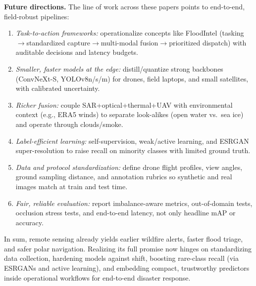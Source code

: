 \documentclass[conference,a4paper]{IEEEtran}
\begin{document}
\textbf{Future directions.} The line of work across these papers points to end-to-end, field-robust pipelines:
\begin{enumerate}
  \item \textit{Task-to-action frameworks:} operationalize concepts like FloodIntel (tasking$\rightarrow$standardized capture$\rightarrow$multi-modal fusion$\rightarrow$prioritized dispatch) with auditable decisions and latency budgets.
  \item \textit{Smaller, faster models at the edge:} distill/quantize strong backbones (ConvNeXt-S, YOLOv8n/s/m) for drones, field laptops, and small satellites, with calibrated uncertainty.
  \item \textit{Richer fusion:} couple SAR+optical+thermal+UAV with environmental context (e.g., ERA5 winds) to separate look-alikes (open water vs.\ sea ice) and operate through clouds/smoke.
  \item \textit{Label-efficient learning:} self-supervision, weak/active learning, and ESRGAN super-resolution to raise recall on minority classes with limited ground truth.
  \item \textit{Data and protocol standardization:} define drone flight profiles, view angles, ground sampling distance, and annotation rubrics so synthetic and real images match at train and test time.
  \item \textit{Fair, reliable evaluation:} report imbalance-aware metrics, out-of-domain tests, occlusion stress tests, and end-to-end latency, not only headline mAP or accuracy.
\end{enumerate}

In sum, remote sensing already yields earlier wildfire alerts, faster flood triage, and safer polar navigation. Realizing its full promise now hinges on standardizing data collection, hardening models against shift, boosting rare-class recall (via ESRGANs and active learning), and embedding compact, trustworthy predictors inside operational workflows for end-to-end disaster response.



  
\end{document}
